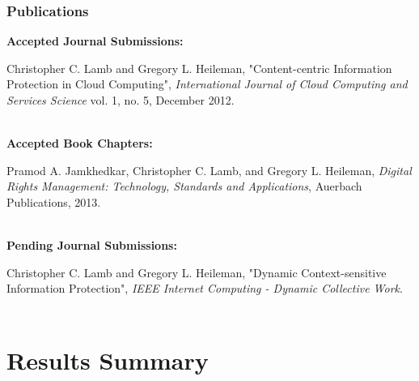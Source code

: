 \documentclass[t,handout]{beamer}
\begin{document}
\begin{frame}
\frametitle{Publications}
{\bf Accepted Journal Submissions:} \\
\begin{scriptsize}
Christopher C. Lamb and Gregory L. Heileman, "Content-centric Information Protection in Cloud Computing", {\it International Journal of Cloud Computing and Services Science} vol. 1, no. 5, December 2012. \\
~\\
\end{scriptsize}
{\bf Accepted Book Chapters:} \\
\begin{scriptsize}
Pramod A. Jamkhedkar, Christopher C. Lamb, and Gregory L. Heileman, {\it Digital Rights Management: Technology, Standards and Applications}, Auerbach Publications, 2013. \\
~\\
\end{scriptsize}
{\bf Pending Journal Submissions:} \\
\begin{scriptsize}
Christopher C. Lamb and Gregory L. Heileman, "Dynamic Context-sensitive Information Protection", {\it IEEE Internet Computing - Dynamic Collective Work}. \\
~\\
\end{scriptsize}
\end{frame}

\section{Results Summary}
\end{document}

